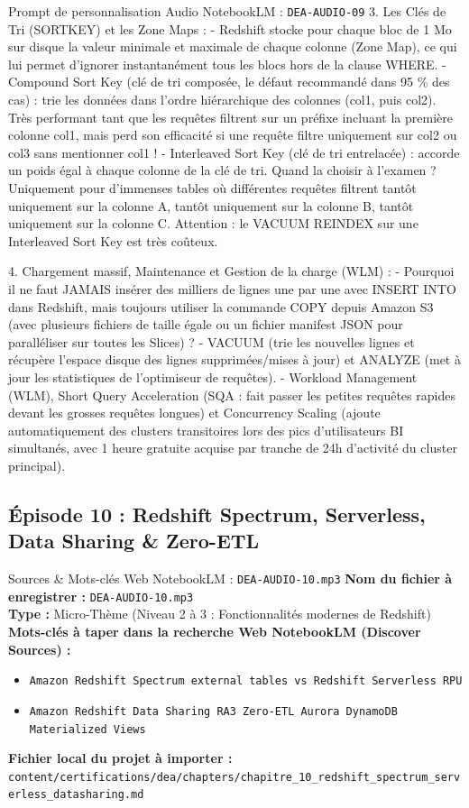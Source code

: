 \documentclass[11pt,a4paper]{article}
\begin{document}
\begin{promptbox}{Prompt de personnalisation Audio NotebookLM : \texttt{DEA-AUDIO-09}}
3. Les Clés de Tri (SORTKEY) et les Zone Maps :
- Redshift stocke pour chaque bloc de 1 Mo sur disque la valeur minimale et maximale de chaque colonne (Zone Map), ce qui lui permet d'ignorer instantanément tous les blocs hors de la clause WHERE.
- Compound Sort Key (clé de tri composée, le défaut recommandé dans 95 \% des cas) : trie les données dans l'ordre hiérarchique des colonnes (col1, puis col2). Très performant tant que les requêtes filtrent sur un préfixe incluant la première colonne col1, mais perd son efficacité si une requête filtre uniquement sur col2 ou col3 sans mentionner col1 !
- Interleaved Sort Key (clé de tri entrelacée) : accorde un poids égal à chaque colonne de la clé de tri. Quand la choisir à l'examen ? Uniquement pour d'immenses tables où différentes requêtes filtrent tantôt uniquement sur la colonne A, tantôt uniquement sur la colonne B, tantôt uniquement sur la colonne C. Attention : le VACUUM REINDEX sur une Interleaved Sort Key est très coûteux.

4. Chargement massif, Maintenance et Gestion de la charge (WLM) :
- Pourquoi il ne faut JAMAIS insérer des milliers de lignes une par une avec INSERT INTO dans Redshift, mais toujours utiliser la commande COPY depuis Amazon S3 (avec plusieurs fichiers de taille égale ou un fichier manifest JSON pour paralléliser sur toutes les Slices) ?
- VACUUM (trie les nouvelles lignes et récupère l'espace disque des lignes supprimées/mises à jour) et ANALYZE (met à jour les statistiques de l'optimiseur de requêtes).
- Workload Management (WLM), Short Query Acceleration (SQA : fait passer les petites requêtes rapides devant les grosses requêtes longues) et Concurrency Scaling (ajoute automatiquement des clusters transitoires lors des pics d'utilisateurs BI simultanés, avec 1 heure gratuite acquise par tranche de 24h d'activité du cluster principal).
\end{promptbox}

\subsection{Épisode 10 : Redshift Spectrum, Serverless, Data Sharing \& Zero-ETL}
\begin{sourcebox}{Sources \& Mots-clés Web NotebookLM : \texttt{DEA-AUDIO-10.mp3}}
\textbf{Nom du fichier à enregistrer :} \texttt{DEA-AUDIO-10.mp3}\\
\textbf{Type :} Micro-Thème (Niveau 2 à 3 : Fonctionnalités modernes de Redshift)\\
\textbf{Mots-clés à taper dans la recherche Web NotebookLM (Discover Sources) :}
\begin{itemize}[noitemsep]
    \item \texttt{Amazon Redshift Spectrum external tables vs Redshift Serverless RPU}
    \item \texttt{Amazon Redshift Data Sharing RA3 Zero-ETL Aurora DynamoDB Materialized Views}
\end{itemize}
\textbf{Fichier local du projet à importer :}
\texttt{content/certifications/dea/chapters/chapitre_10_redshift_spectrum_serverless_datasharing.md}
\end{sourcebox}
\end{document}
